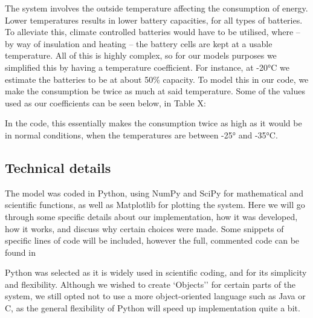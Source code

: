 \documentclass{article}
\begin{document}
The system involves the outside temperature affecting the consumption of energy. Lower temperatures results in lower battery capacities, for all types of batteries. To alleviate this, climate controlled batteries would have to be utilised, where -- by way of insulation and heating -- the battery cells are kept at a usable temperature. All of this is highly complex, so for our models purposes we simplified this by having a temperature coefficient. For instance, at -20°C we estimate the batteries to be at about 50\% capacity. To model this in our code, we make the consumption be twice as much at said temperature. Some of the values used as our coefficients can be seen below, in Table X:

\begin{table}[H]
    \end{table}

In the code, this essentially makes the consumption twice as high as it would be in normal conditions, when the temperatures are between -25° and -35°C.


\subsection{Technical details}

The model was coded in Python, using NumPy and SciPy for mathematical and scientific functions, as well as Matplotlib for plotting the system. Here we will go through some specific details about our implementation, how it was developed, how it works, and discuss why certain choices were made. Some snippets of specific lines of code will be included, however the full, commented code can be found in %

Python was selected as it is widely used in scientific coding, and for its simplicity and flexibility. Although we wished to create ‘Objects’' for certain parts of the system, we still opted not to use a more object-oriented language such as Java or C, as the general flexibility of Python will speed up implementation quite a bit. 
\end{document}
